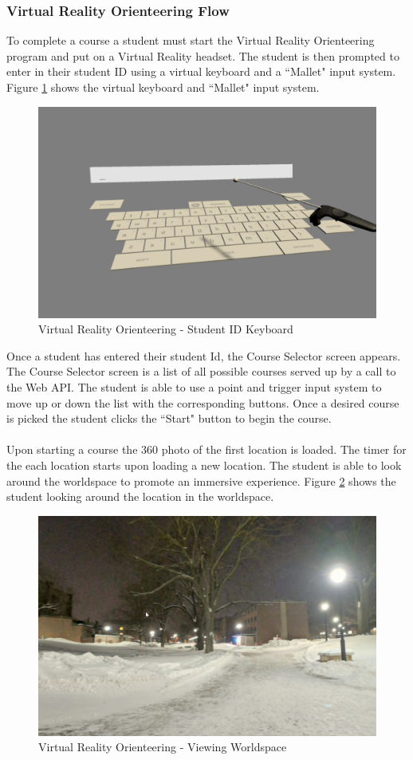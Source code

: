 \subsubsection{Virtual Reality Orienteering Flow}
To complete a course a student must start the Virtual Reality Orienteering program and put on a Virtual Reality headset. The student is then prompted to enter in their student ID using a virtual keyboard and a ``Mallet" input system. Figure \ref{VR Keyboard} shows the virtual keyboard and ``Mallet" input system.
\begin{figure}[h]
	\centering
	\includegraphics[width=.5\textwidth]{Requirements/assets/vr-keyboard.png}
	\caption[Virtual Reality Orienteering - Student ID Keyboard]{\label{VR Keyboard}Virtual Reality Orienteering - Student ID Keyboard}
\end{figure}
Once a student has entered their student Id, the Course Selector screen appears. The Course Selector screen is a list of all possible courses served up by a call to the Web API. The student is able to use a point and trigger input system to move up or down the list with the corresponding buttons. Once a desired course is picked the student clicks the ``Start" button to begin the course.\\
\\
Upon starting a course the 360 photo of the first location is loaded. The timer for the each location starts upon loading a new location. The student is able to look around the worldspace to promote an immersive experience. Figure \ref{VR Worldspace} shows the student looking around the location in the worldspace. 
\begin{figure}[htb]
	\centering
	\includegraphics[width=.5\textwidth]{Requirements/assets/vr-worldspace.png}
	\caption[Virtual Reality Orienteering - Veiwing Worldspace]{\label{VR Worldspace}Virtual Reality Orienteering - Viewing Worldspace}
\end{figure}
